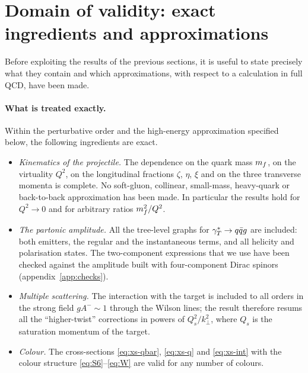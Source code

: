 \section{Domain of validity: exact ingredients and approximations}
\label{sec:validity}

Before exploiting the results of the previous sections, it is useful to state precisely what they
contain and which approximations, with respect to a calculation in full QCD, have been made.

\paragraph{What is treated exactly.} Within the perturbative order and the high-energy approximation
specified below, the following ingredients are exact.
\begin{itemize}
\item \emph{Kinematics of the projectile.} The dependence on the quark mass $m_f$, on the virtuality
$Q^2$, on the longitudinal fractions $\zeta$, $\eta$, $\xi$ and on the three transverse momenta is
complete. No soft-gluon, collinear, small-mass, heavy-quark or back-to-back approximation has been made.
In particular the results hold for $Q^2\to0$ and for arbitrary ratios $m_f^2/Q^2$.
\item \emph{The partonic amplitude.} All the tree-level graphs for $\gamma_T^*\to q\bar q g$ are included: both
emitters, the regular and the instantaneous terms, and all helicity and polarisation states. The
two-component expressions that we use have been checked against the amplitude built with
four-component Dirac spinors (appendix~\ref{app:checks}).
\item \emph{Multiple scattering.} The interaction with the target is included to all orders in the
strong field $gA^-\sim1$ through the Wilson lines; the result therefore resums all the ``higher-twist''
corrections in powers of $Q_s^2/k_\perp^2$, where $Q_s$ is the saturation momentum of the target.
\item \emph{Colour.} The cross-sections \eqref{eq:xs-qbar}, \eqref{eq:xs-q} and \eqref{eq:xs-int} with
the colour structure \eqref{eq:S6}--\eqref{eq:W} are valid for any number of colours.
\end{itemize}

